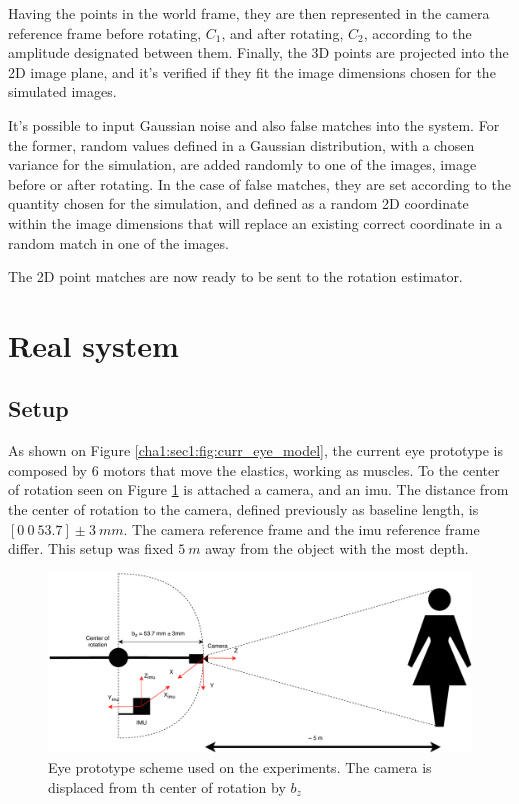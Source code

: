 Having the points in the world frame, they are then represented in the camera reference frame before rotating, ${C_1}$, and after rotating, ${C_2}$, according to the amplitude designated between them. Finally, the 3D points are projected into the 2D image plane, and it's verified if they fit the image dimensions chosen for the simulated images.

It's possible to input Gaussian noise and also false matches into the system. For the former, random values defined in a Gaussian distribution, with a chosen variance for the simulation, are added randomly to one of the images, image before or after rotating. In the case of false matches, they are set according to the quantity chosen for the simulation, and defined as a random 2D coordinate within the image dimensions that will replace an existing correct coordinate in a random match in one of the images.

The 2D point matches are now ready to be sent to the rotation estimator.

\section{Real system}

\subsection{Setup}
As shown on Figure \ref{cha1:sec1:fig:curr_eye_model}, the current eye prototype is composed by 6 motors that move the elastics, working as muscles. To the center of rotation seen on Figure \ref{cha4:sec3:eyescheme} is attached a camera, and an \acrshort{imu}. The distance from the center of rotation to the camera, defined previously as baseline length, is $[0 \ 0 \ 53.7] \pm 3 \ mm $. The camera reference frame and the \acrshort{imu} reference frame differ. 
This setup was fixed $5 \ m$ away from the object with the most depth.
\begin{figure}[ht]
	\centering
	\includegraphics[width=\textwidth]{images/eyescheme.pdf}
	\caption[Eye prototype scheme used on the experiments]{Eye prototype scheme used on the experiments. The camera is displaced from th center of rotation by $b_z$ }
	\label{cha4:sec3:eyescheme}
\end{figure}

